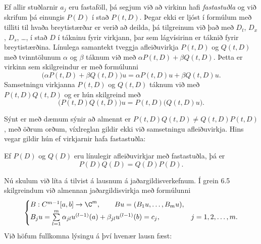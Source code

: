 Ef allir stuðlarnir $a_j$ eru fastaföll, þá
segjum við að virkinn hafi {\it fastastuðla} og við
skrifum  þá einungis $P(D)$ í stað $P(t,D)$.  
Þegar ekki er ljóst í formúlum með tilliti til hvaða breytistærðar er
verið að deilda, þá tilgreinum  við það með 
$D_t$, $D_x$, $D_s$, \dots, í stað $D$
í tákninu fyrir virkjann, þar sem lágvísirinn er táknið fyrir
breytistærðina. 
Línulega samantekt tveggja
afleiðuvirkja $P(t,D)$ og $Q(t,D)$ með tvinntölunum $\alpha$ og
$\beta$ táknum við með $\alpha P(t,D)+\beta Q(t,D)$.  Þetta er
virkinn sem skilgreindur er með formúlunni
$$
\big(\alpha P(t,D) + \beta Q(t,D)\big)u=
\alpha P(t,D)u + \beta Q(t,D)u.
$$
Samsetningu virkjanna $P(t,D)$ og $Q(t,D)$ táknum við með
$P(t,D)Q(t,D)$ og er hún skilgreind með
$$
\big(P(t,D)Q(t,D)\big)u=
P(t,D)\big(Q(t,D)u\big).
$$


Sýnt er með dæmum sýnir að almennt
er $P(t,D)Q(t,D)\neq Q(t,D)P(t,D)$, með öðrum orðum, víxlreglan
gildir ekki við samsetningu afleiðuvirkja.
Hins vegar gildir hún ef virkjarnir hafa fastastuðla:

\begin{se}
Ef $P(D)$ og $Q(D)$ eru línulegir
afleiðuvirkjar með
fastastuðla,
þá er
 $$P(D)Q(D)=Q(D)P(D).
 $$
\end{se}



Nú skulum við líta á tilvist á lausnum á jaðargildisverkefnum.  Í grein
6.5 skilgreindum við almennan jaðargildisvirkja með formúlunni
\begin{equation*}
\begin{cases}
B:C^{m-1}[a,b]\to \C^m, \qquad Bu=(B_1u,\dots,B_mu),\\
B_ju=\sum\limits_{l=1}^m {\alpha}_{jl}u^{(l-1)}(a)
+{\beta}_{jl}u^{(l-1)}(b)=c_j,  &j=1,2,\dots,m.
\end{cases}\label{2.1.9}
\end{equation*}
Við höfum fullkomna lýsingu á því hvenær lausn fæst:

